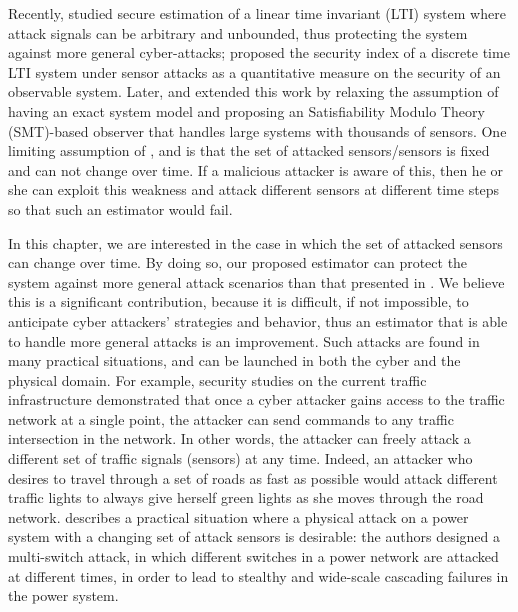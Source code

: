 \documentclass[../../thesis.tex]{subfiles}
\begin{document}
Recently, \cite{Fawzi:2014} studied secure estimation of a linear time invariant (LTI) system where attack signals can be arbitrary and unbounded, thus protecting the system against more general cyber-attacks; \cite{chong2016characterising} proposed the security index of a discrete time LTI system under sensor attacks as a quantitative measure on the security of an observable system.
Later, \cite{Pajic:2014} and \cite{shoukry2016smt} extended this work by relaxing the assumption of having an exact system model and proposing an Satisfiability Modulo Theory (SMT)-based observer that handles large systems with thousands of sensors. One limiting assumption of \cite{Fawzi:2014}, \cite{Pajic:2014} and \cite{shoukry2016smt} is that the set of attacked sensors/sensors is fixed and can not change over time. If a malicious attacker is aware of this, then he or she can exploit this weakness and attack different sensors at different time steps so that such an estimator would fail.

In this chapter, we are interested in the case in which the set of attacked sensors can change over time. By doing so, our proposed estimator can protect the system against more general attack scenarios than that presented in \cite{Fawzi:2014}. We believe this is a significant contribution, because it is difficult, if not impossible, to anticipate cyber attackers' strategies and behavior, thus an estimator that is able to handle more general attacks is an improvement. 
Such attacks are found in many practical situations, and can be launched in both the cyber and the physical domain.
For example, security studies on the current traffic infrastructure \cite{ghena2014traffic} demonstrated that once a cyber attacker gains access to the traffic network at a single point, the attacker can send commands to any traffic intersection in the network. In other words, the attacker can freely attack a different set of traffic signals (sensors) at any time. Indeed, an attacker who desires to travel through a set of roads as fast as possible would attack different traffic lights to always give herself green lights as she moves through the road network. 
\cite{liu2014coordinated} describes a practical situation where a physical attack on a power system with a changing set of attack sensors is desirable: the authors designed a multi-switch attack, in which different switches in a power network are attacked at different times, in order to lead to stealthy and wide-scale cascading failures in the power system.
\end{document}
